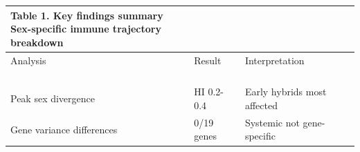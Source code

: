 \begin{longtable}{lll}
\caption*{
{\large Table 1. Key findings summary} \\ 
{\small Sex-specific immune trajectory breakdown}
} \\ 
\toprule
Analysis & Result & Interpretation \\ 
\midrule\addlinespace[2.5pt]
\cellcolor[HTML]{ADD8E6}{PERMANOVA - Infection} & \cellcolor[HTML]{ADD8E6}{p = 0.032} & \cellcolor[HTML]{ADD8E6}{Infection alters immune profiles} \\ 
\cellcolor[HTML]{ADD8E6}{PERMANOVA - Sex×HI×He} & \cellcolor[HTML]{ADD8E6}{p = 0.021} & \cellcolor[HTML]{ADD8E6}{Complex sex-specific hybrid effects} \\ 
\cellcolor[HTML]{ADD8E6}{Dispersion - HI×Infection} & \cellcolor[HTML]{ADD8E6}{p = 0.00169} & \cellcolor[HTML]{ADD8E6}{Hybrid effects depend on infection} \\ 
\cellcolor[HTML]{ADD8E6}{Male trajectory collapse} & \cellcolor[HTML]{ADD8E6}{5.67 → 2.59 units} & \cellcolor[HTML]{ADD8E6}{Males lose coordination when infected} \\ 
Peak sex divergence & HI 0.2-0.4 & Early hybrids most affected \\ 
Gene variance differences & 0/19 genes & Systemic not gene-specific \\ 
\bottomrule
\end{longtable}

